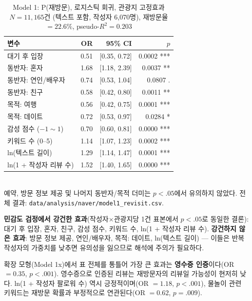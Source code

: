 \documentclass[10pt,a4paper]{article}
\begin{document}
\begin{table}[H]\centering
\caption{Model 1: P(재방문), 로지스틱 회귀, 관광지 고정효과\\
\footnotesize $N = 11{,}165$건 (텍스트 포함, 작성자 6,070명), 재방문율 $= 22.6\%$, pseudo-$R^2 = 0.203$}
\footnotesize
\begin{tabular}{@{}lrrr@{}}
\toprule
변수 & OR & 95\% CI & $p$ \\
\midrule
대기 후 입장              & 0.51 & [0.35, 0.72] & 0.0002 *** \\
동반자: 혼자                & 1.68 & [1.18, 2.39] & 0.0037 ** \\
동반자: 연인/배우자           & 0.74 & [0.53, 1.04] & 0.0807 . \\
동반자: 친구                 & 0.58 & [0.42, 0.80] & 0.0011 ** \\
목적: 여행                    & 0.56 & [0.42, 0.75] & 0.0001 *** \\
목적: 데이트                   & 0.72 & [0.53, 0.97] & 0.0284 * \\
감성 점수 ($-1 \sim 1$)       & 0.70 & [0.60, 0.81] & 0.0000 *** \\
키워드 수 (0--5)               & 1.14 & [1.07, 1.23] & 0.0002 *** \\
ln(텍스트 길이)                 & 1.29 & [1.14, 1.47] & 0.0001 *** \\
ln(1 + 작성자 리뷰 수)           & 1.52 & [1.40, 1.65] & 0.0000 *** \\
\bottomrule
\end{tabular}
\\[3pt]
{\scriptsize 예약, 방문 정보 제공 및 나머지 동반자/목적 더미는 $p<.05$에서 유의하지 않았다. 전체 결과: \texttt{data/analysis/naver/model1\_revisit.csv}.}
\end{table}

\textbf{민감도 검정에서 강건한 효과}(작성자×관광지당 1건 표본에서 $p<.05$로
동일한 결론): 대기 후 입장, 혼자, 친구, 감성 점수, 키워드 수, ln(1 + 작성자
리뷰 수). \textbf{강건하지 않은 효과}: 방문 정보 제공, 연인/배우자, 목적:
데이트, ln(텍스트 길이) — 이들은 반복 작성자의 가중치를 낮추면 유의성을
잃으므로 해석에 주의가 필요하다.

확장 모형(Model 1x)에서 표 전체를 통틀어 가장 큰 효과는 \textbf{영수증
인증}이다(OR $= 0.35$, $p<.001$). 영수증으로 인증된 리뷰는 재방문자의
리뷰일 가능성이 현저히 낮다. ln(1 + 작성자 팔로워 수) 역시 긍정적이며(OR
$=1.18$, $p<.001$), 물놀이 관련 키워드는 재방문 확률과 부정적으로
연관된다(OR $=0.62$, $p=.009$).
\end{document}
